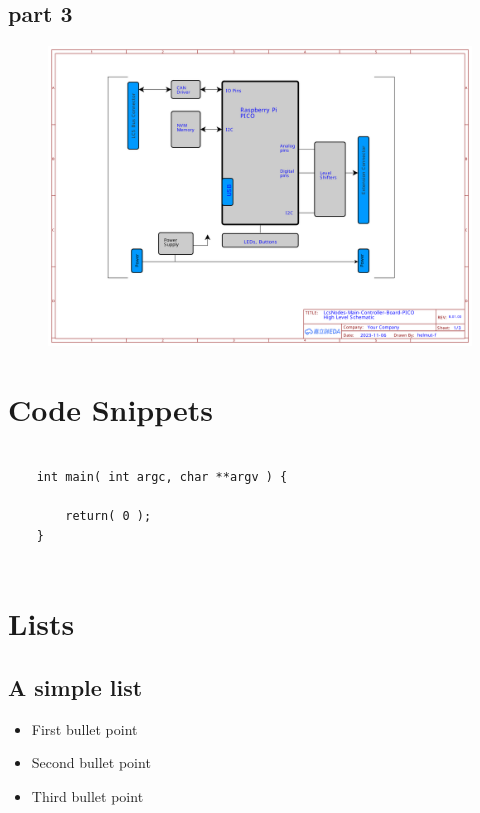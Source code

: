 \FloatBarrier

\subsection{part 3}
\begin{figure}[ht]
    \centering
    \includegraphics[page=3, width=\textwidth]{./schematics/Schematic_LcsNodes-Main-Controller-Board-B.01.00.pdf}
\end{figure}

\FloatBarrier


\section{Code Snippets}

\lstset{style=listingstyle}
\begin{lstlisting}

    int main( int argc, char **argv ) {

        return( 0 );
    }
    
\end{lstlisting}


\section{Lists}

\subsection{A simple list}

\begin{itemize}
    \item First bullet point
    \item Second bullet point
    \item Third bullet point
\end{itemize}



